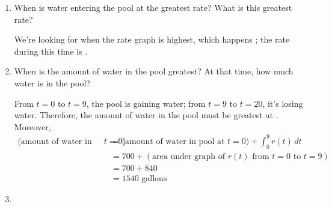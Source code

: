 \documentclass[main]{subfiles}
\begin{document}
\begin{enumerate}[resume]
\begin{enumerate}
    \begin{solution}
      In {{{{\#3}}(a)}}, we found
      that the pool gains $705$ gallons of water between $t = 0$ and $t =
      6$.  We were told that the pool had 700 gallons of water at $t = 0$,
      so at $t = 6$, it has $700 + 705 = \boxed{1405}$ gallons of water.
    \end{solution}

  \item
    \begin{problem}[0.25in]
      When is water entering the pool at the greatest rate?  What is this
      greatest rate?
    \end{problem}

    \begin{solution}
      We're looking for when the rate graph is highest, which happens
      ; the rate during this time is
      .
    \end{solution}

  \item
    \begin{problem}[\vfill]
      When is the amount of water in the pool greatest?  At that time,
      how much water is in the pool?
    \end{problem}

    \begin{solution}
      From $t = 0$ to $t = 9$, the pool is gaining water; from $t = 9$
      to $t = 20$, it's losing water.  Therefore, the amount of water in
      the pool must be greatest at .  Moreover,
      \begin{align*}
        \text{(amount of water in pool at $t = 9$)} &= \text{(amount of
          water in pool at $t = 0$)} + \int_0^9 r(t)\,dt \\
        &= 700 + (\text{area under graph of $r(t)$ from $t = 0$ to $t =
          9$}) \\
        &= 700 + 840 \\
        &= \boxed{1540 \text{ gallons}}
      \end{align*}
    \end{solution}

  \item



\end{enumerate}
\end{enumerate}
\end{document}
